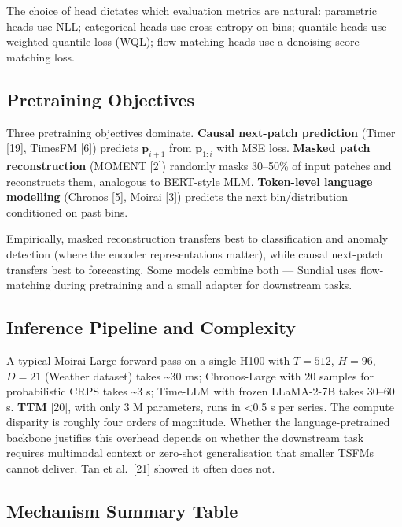 The choice of head dictates which evaluation metrics are natural: parametric heads use NLL; categorical heads use cross-entropy on bins; quantile heads use weighted quantile loss (WQL); flow-matching heads use a denoising score-matching loss.

\subsection{Pretraining Objectives}\label{pretraining-objectives}

Three pretraining objectives dominate. \textbf{Causal next-patch prediction} (Timer {[}19{]}, TimesFM {[}6{]}) predicts \(\mathbf{p}_{i+1}\) from \(\mathbf{p}_{1:i}\) with MSE loss. \textbf{Masked patch reconstruction} (MOMENT {[}2{]}) randomly masks 30--50\% of input patches and reconstructs them, analogous to BERT-style MLM. \textbf{Token-level language modelling} (Chronos {[}5{]}, Moirai {[}3{]}) predicts the next bin/distribution conditioned on past bins.

Empirically, masked reconstruction transfers best to classification and anomaly detection (where the encoder representations matter), while causal next-patch transfers best to forecasting. Some models combine both --- Sundial uses flow-matching during pretraining and a small adapter for downstream tasks.

\subsection{Inference Pipeline and Complexity}\label{inference-pipeline-and-complexity}

A typical Moirai-Large forward pass on a single H100 with \(T=512\), \(H=96\), \(D=21\) (Weather dataset) takes \textasciitilde30 ms; Chronos-Large with 20 samples for probabilistic CRPS takes \textasciitilde3 s; Time-LLM with frozen LLaMA-2-7B takes 30--60 s. \textbf{TTM} {[}20{]}, with only 3 M parameters, runs in \textless0.5 s per series. The compute disparity is roughly four orders of magnitude. Whether the language-pretrained backbone justifies this overhead depends on whether the downstream task requires multimodal context or zero-shot generalisation that smaller TSFMs cannot deliver. Tan et al.~{[}21{]} showed it often does not.

\subsection{Mechanism Summary Table}\label{mechanism-summary-table}

